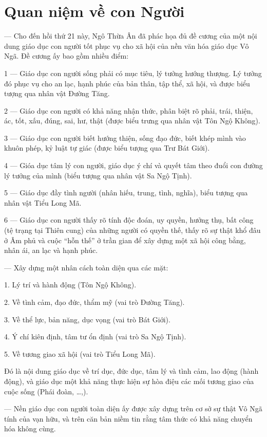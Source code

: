 
\section{Quan niệm về con Người} %
\label{sec:9_con_nguoi}

— Cho đến hồi thứ 21 này, Ngô Thừa Ân đã phác họa đủ đề cương của một nội dung giáo dục con người tốt phục vụ cho xã hội của nền văn hóa giáo dục Vô Ngã. Đề cương ấy bao gồm nhiều điểm:

1 — Giáo dục con người sống phải có mục tiêu, lý tưởng hướng thượng. Lý tưởng đó phục vụ cho an lạc, hạnh phúc của bản thân, tập thể, xã hội, và được biểu tượng qua nhân vật Đường Tăng.

2 — Giáo dục con người có khả năng nhận thức, phân biệt rõ phải, trái, thiện, ác, tốt, xấu, đúng, sai, hư, thật (được biểu trưng qua nhân vật Tôn Ngộ Không).

3 — Giáo dục con người biết hướng thiện, sống đạo đức, biết khép mình vào khuôn phép, kỷ luật tự giác (được biểu tượng qua Trư Bát Giới).

4 — Gióa dục tâm lý con người, giáo dục ý chí và quyết tâm theo đuổi con đường lý tưởng của mình (biểu tượng qua nhân vật Sa Ngộ Tịnh).

5 — Giáo dục đầy tình người (nhân hiếu, trung, tình, nghĩa), biểu tượng qua nhân vật Tiểu Long Mã.

6 — Giáo dục con người thấy rõ tính độc đoán, uy quyền, hưởng thụ, bất công (tệ trạng tại Thiên cung) của những người có quyền thế, thấy rõ sự thật khổ đâu ở Âm phủ và cuộc ``hỗn thế'' ở trần gian để xây dựng một xã hội công bằng, nhân ái, an lạc và hạnh phúc.

— Xây dựng một nhân cách toàn diện qua các mặt:

1. Lý trí và hành động (Tôn Ngộ Không).

2. Về tình cảm, đạo đức, thẩm mỹ (vai trò Đường Tăng).

3. Về thể lực, bản năng, dục vọng (vai trò Bát Giới).

4. Ý chí kiên định, tâm tư ổn định (vai trò Sa Ngộ Tịnh).

5. Về tương giao xã hội (vai trò Tiểu Long Mã).

Đó là nội dung giáo dục về trí dục, đức dục, tâm lý và tình cảm, lao động (hành động), và giáo dục một khả năng thực hiện sự hòa điệu các mối tương giao của cuộc sống (Phái đoàn, \ldots,).

— Nền giáo dục con người toàn diện ấy được xây dựng trên cơ sở sự thật Vô Ngã tính của vạn hữu, và trên căn bản niềm tin rằng tâm thức có khả năng chuyển hóa không cùng.

